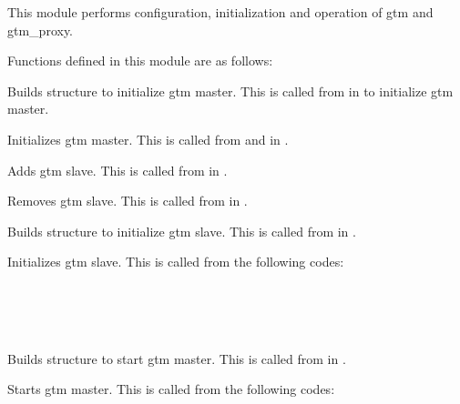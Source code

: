   This module performs configuration, initialization and operation of gtm and gtm\_proxy.
  
  Functions defined in this module are as follows:
  
  
      Builds  structure to initialize gtm master.
      This is called from  in  to initialize gtm master.
  
  
      Initializes gtm master.
      This is called from  and  in .
  
  
      Adds gtm slave.
      This is called from  in .
  
  
      Removes gtm slave.
      This is called from  in .
  
  
      Builds  structure to initialize gtm slave.
      This is called from  in .
  
  
      Initializes gtm slave.
      This is called from the following codes:
      
      \FuncRefHdr
		  \vspace{-10pt} \\ 
		  \vspace{-10pt} \\ 
		  \vspace{-10pt} \\ \hline
      \FuncRefTrailor
  
  
      Builds  structure to start gtm master.
      This is called from  in .
  
  
  
      Starts gtm master.
      This is called from the following codes:
      
